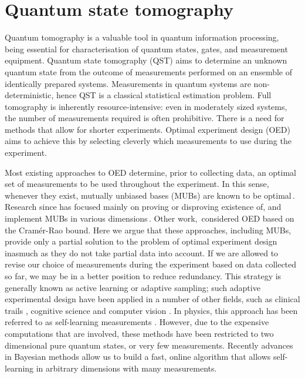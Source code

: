 \chapter{Quantum state tomography}

Quantum tomography is a valuable tool in quantum information processing, being essential for characterisation of quantum states, gates, and measurement equipment.  Quantum state tomography (QST) aims to determine an unknown quantum state from the outcome of measurements performed on an ensemble of identically prepared systems. Measurements in quantum systems are non-deterministic, hence QST is a classical statistical estimation problem. Full tomography is inherently resource-intensive: even in moderately sized systems, the number of measurements required is often prohibitive.
There is a need for methods that allow for shorter experiments. Optimal experiment design (OED) aims to achieve this by selecting cleverly which measurements to use during the experiment.

Most existing approaches to OED determine, prior to collecting data, an optimal set of measurements to be used throughout the experiment. In this sense, whenever they exist, mutually unbiased bases (MUBs) are known to be optimal\,\cite{MUBFirst,MUBExperiment}. Research since has focused mainly on proving or disproving existence of, and implement MUBs in various dimensions\,\cite{DimensionSix,MUBQutrit,MUBExperiment}. Other work,\,\cite{OEDFirst,OEDAverage} considered OED based on the Cram\'{e}r-Rao bound. Here we argue that these approaches, including MUBs, provide only a partial solution to the problem of optimal experiment design inasmuch as they do not take partial data into account. If we are allowed to revise our choice of measurements during the experiment based on data collected so far, we may be in a better position to reduce redundancy. This strategy is generally known as active learning or adaptive sampling; such adaptive experimental design have been applied in a number of other fields, such as clinical trails \cite{Berry2006}, cognitive science \cite{Cavagnaro2010} and computer vision \cite{Vondrick2011}. In physics, this approach has been referred to as self-learning measurements \cite{SelfLearning, SelfLearningExperimental}. However, due to the expensive computations that are involved, these methods have been restricted to two dimensional pure quantum states, or very few measurements. Recently advances in Bayesian methods allow us to build a fast, online algorithm that allows self-learning in arbitrary dimensions with many measurements. 

